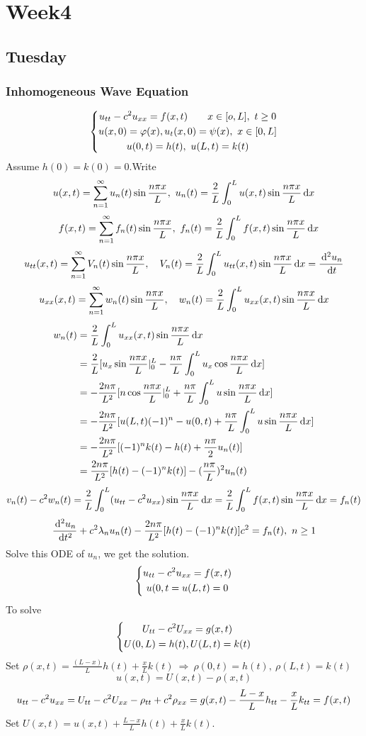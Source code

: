 
\chapter{Week4}

\section{Tuesday}
\subsection{Inhomogeneous Wave Equation}
\[\left\{\begin{gathered}u_{tt}-c^2u_{xx}=f(x,t)\qquad x\in[o,L], ~t\geq0\\u(x,0)=\varphi(x), u_t(x,0)=\psi(x), ~x\in[0,L]\\u(0,t)=h(t), ~u(L,t)=k(t)\end{gathered}\right.
\]
Assume $h(0)=k(0)=0$.Write 
 \[u(x,t)=\sum_{n=1}^\infty u_n(t)\sin\frac{n\pi x}{L},~u_n(t)=\frac{2}{L}\int_0^L u(x,t)\sin\frac{n\pi x}{L}\,\mathrm{d} x\] 
\[\quad f(x,t)=\sum_{n=1}^\infty f_n(t)\sin\frac{n\pi x}{L},~f_n(t)=\frac{2}{L}\int_0^L f(x,t)\sin\frac{n\pi x}{L}\,\mathrm{d} x\]
\[u_{tt}(x,t)=\sum_{n=1}^\infty V_n(t)\sin \frac{n\pi x}{L},\quad  V_n(t)=\frac{2}{L}\int_0^L u_{tt}(x,t)\sin \frac{n\pi x}{L}\,\mathrm{d} x=\frac{\,\mathrm{d}^2u_n}{\,\mathrm{d} t}
\]
\[u_{xx}(x,t)=\sum_{n=1}^\infty w_n(t)\sin\frac{n\pi x}{L},\quad w_n(t)=\frac{2}{L}\int_0^L u_{xx}(x,t)\sin \frac{n\pi x}{L}\,\mathrm{d} x
\]
\[\begin{aligned}w_n(t)&=\frac{2}{L}\int_0^L u_{xx}(x,t)\sin\frac{n\pi x}{L}\,\mathrm{d} x\\
&=\frac{2}{L}[u_x\sin\frac{n\pi x}{L}|_0^L-\frac{n\pi}{L}\int_0^Lu_x\cos \frac{n\pi x}{L}\,\mathrm{d} x]\\
&=-\frac{2n\pi}{L^2}[n\cos\frac{n\pi x}{L}|_0^L+\frac{n\pi}{L}\int_0^Lu\sin\frac{n\pi x}{L}\,\mathrm{d} x]\\
&=-\frac{2n\pi}{L^2}[u(L,t)(-1)^n-u(0,t)+\frac{n\pi}{L}\int_0^Lu\sin\frac{n\pi x}{L}\,\mathrm{d} x]\\
&=-\frac{2n\pi}{L^2}[(-1)^nk(t)-h(t)+\frac{n\pi}{2}u_n(t)]\\
&=\frac{2n\pi}{L^2}[h(t)-(-1)^nk(t)]-(\frac{n\pi}{L})^2u_n(t)
\end{aligned}
\]
\[v_n(t)-c^2w_n(t)=\frac{2}{L}\int_0^L(u_{tt}-c^2u_{xx})\sin\frac{n\pi x}{L}\,\mathrm{d} x=\frac{2}{L}\int_0^Lf(x,t)\sin\frac{n\pi x}{L}\,\mathrm{d} x=f_n(t)
\]
\[\frac{\,\mathrm{d}^2u_n}{\,\mathrm{d} t^2}+c^2\lambda_nu_n(t)-\frac{2n\pi}{L^2}[h(t)-(-1)^nk(t)]c^2=f_n(t),~n\geq1
\]
Solve this ODE of $u_n$, we get the solution.\\
\[\left\{\begin{gathered}u_{tt}-c^2u_{xx}=f(x,t)\\u(0,t=u(L,t)=0\end{gathered}\right.
\]
To solve
\[\left\{\begin{gathered}U_{tt}-c^2U_{xx}=g(x,t)\\U(0,L)=h(t), U(L,t)=k(t)\end{gathered}\right.
\]
Set $\rho(x,t)=\frac{(L-x)}{L}h(t)+\frac{x}{L}k(t)~\Rightarrow~ \rho(0,t)=h(t),~\rho(L,t)=k(t)$
\[u(x,t)=U(x,t)-\rho(x,t)
\]
\[u_{tt}-c^2u_{xx}=U_{tt}-c^2U_{xx}-\rho_{tt}+c^2\rho_{xx}=g(x,t)-\frac{L-x}{L}h_{tt}-\frac{x}{L}k_{tt}=f(x,t)
\]
Set $U(x,t)=u(x,t)+\frac{L-x}{L}h(t)+\frac{x}{L}k(t)$.


